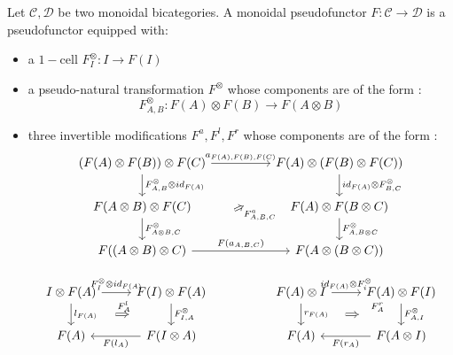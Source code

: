 \documentclass[10pt]{llncs}
\begin{document}
\begin{definition}
Let $\mathcal{C}, \mathcal{D}$ be two monoidal bicategories. A monoidal pseudofunctor $F : \mathcal{C} \rightarrow \mathcal{D}$ is a pseudofunctor equipped with:
\begin{itemize}
\item a $1-$cell $F_{I}^{\otimes}: I \rightarrow F(I)$
\item a pseudo-natural transformation $F^\otimes$ whose components are of the form : $$F_{A,B}^\otimes : F(A) \otimes F(B) \rightarrow F(A \otimes B)$$
\item three invertible modifications $F^a, F^l, F^r$ whose components are of the form : 
$$
\begin{tikzcd}
(F(A) \otimes F(B)) \otimes F(C)
\arrow{rr}{a_{F(A),F(B),F(C)}}
\arrow{d}{F_{A,B}^{\otimes} \otimes id_{F(A)}}
&&
F(A) \otimes (F(B) \otimes F(C))
\arrow{d}{id_{F(A)} \otimes F_{B,C}^\otimes}
\\
F(A\otimes B) \otimes F(C)
\arrow{d}{F_{A\otimes B, C}^\otimes}
&&
F(A) \otimes F(B \otimes C)
\arrow{d}{F_{A,B\otimes C}^\otimes}
\\
F((A \otimes B) \otimes C)
\arrow{rr}{F(a_{A,B,C})}
\arrow[Rightarrow, shorten >=2.2cm, shorten <=2.1cm]{rruu}[swap]{F^{a}_{A,B,C}}
&&
F(A \otimes (B \otimes C))
\end{tikzcd}$$

$$\begin{tikzcd}
I \otimes F(A)
\arrow{r}{F_{I}^\otimes \otimes id_{F(A)}}
\arrow{d}{l_{F(A)}}[name=A]{}
&
F(I) \otimes F(A)
\arrow{d}{F_{I,A}^\otimes}[name=B]{}
\arrow[Rightarrow, shorten >=1.2cm, shorten <=1.1cm,from=A,to=B]{}[]{F_{A}^l}
&&
F(A) \otimes I
\arrow{r}{id_{F(A)} \otimes F_{i}^\otimes}
\arrow{d}{r_{F(A)}}[name=C]{}
&
F(A) \otimes F(I)
\arrow{d}{F_{A,I}^\otimes}[name=D]{}
\arrow[Rightarrow, shorten >=1.2cm, shorten <=1.1cm,from=C,to=D]{}[near end]{F_{A}^r}
\\
F(A)
&
F(I \otimes A)
\arrow{l}{F(l_A)}
&&
F(A)
&
F(A \otimes I)
\arrow{l}{F(r_A)}
\end{tikzcd}$$


\end{itemize}
\end{definition}
\end{document}
